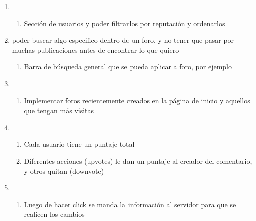\documentclass[12pt, letterpaper, notitlepage]{article}
\begin{document}
\begin{enumerate}
    
    \item {}
    	\begin{enumerate}
			\item Sección de usuarios y poder filtrarlos por reputación y ordenarlos
		\end{enumerate}

    
    \item {}
    {poder buscar algo especifico dentro de un foro, y no tener que pasar por muchas publicaciones antes de encontrar lo que quiero}
    	\begin{enumerate}
			\item Barra de búsqueda general que se pueda aplicar a foro, por ejemplo 
		\end{enumerate}

    
    \item {}
    	\begin{enumerate}
            \item Implementar foros recientemente creados en la página de inicio y aquellos que tengan más visitas
		\end{enumerate}

		
	\item {}
		\begin{enumerate}
			\item Cada usuario tiene un puntaje total
			\item Diferentes acciones (upvotes) le dan un puntaje al creador del comentario, y otros quitan (downvote)	
		\end{enumerate}
		

		

		
	
	\item {}
		\begin{enumerate}
			\item Luego de hacer click se manda la información al servidor para que se realicen los cambios
		\end{enumerate}
	

\end{enumerate}
\end{document}
